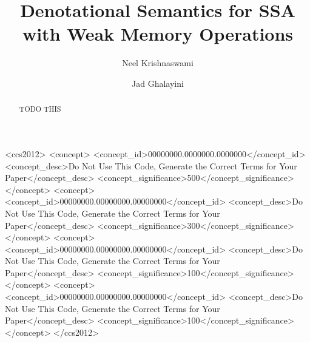\documentclass[acmsmall,screen,review]{acmart}
\begin{document}
\title{Denotational Semantics for SSA with Weak Memory Operations}

\author{Neel Krishnaswami}

\author{Jad Ghalayini}

\begin{abstract}
  TODO THIS
\end{abstract}

\begin{CCSXML}
<ccs2012>
 <concept>
  <concept_id>00000000.0000000.0000000</concept_id>
  <concept_desc>Do Not Use This Code, Generate the Correct Terms for Your Paper</concept_desc>
  <concept_significance>500</concept_significance>
 </concept>
 <concept>
  <concept_id>00000000.00000000.00000000</concept_id>
  <concept_desc>Do Not Use This Code, Generate the Correct Terms for Your Paper</concept_desc>
  <concept_significance>300</concept_significance>
 </concept>
 <concept>
  <concept_id>00000000.00000000.00000000</concept_id>
  <concept_desc>Do Not Use This Code, Generate the Correct Terms for Your Paper</concept_desc>
  <concept_significance>100</concept_significance>
 </concept>
 <concept>
  <concept_id>00000000.00000000.00000000</concept_id>
  <concept_desc>Do Not Use This Code, Generate the Correct Terms for Your Paper</concept_desc>
  <concept_significance>100</concept_significance>
 </concept>
</ccs2012>
\end{CCSXML}




\maketitle
\end{document}
